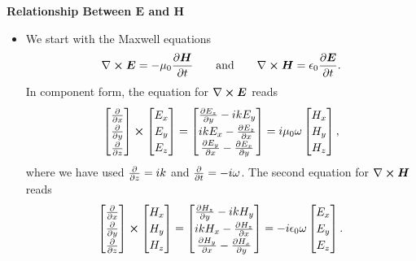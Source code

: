 \documentclass[11pt, a4paper]{article}
\newcommand{\eqtext}[1]{\qquad \text{#1} \qquad}
\renewcommand{\vec}[1]{\bm{#1}} %
\newcommand{\E}{\vec{E}}  %
\renewcommand{\H}{\vec{H}}  %
\newcommand{\ee}{\epsilon_{0}}  %
\newcommand{\mm}{\mu_{0}}  %
\newcommand{\m}{\vec{m}}  %
\renewcommand{\curl}{\nabla \cross}
\begin{document}
\textbf{Relationship Between $ \E $ and $ \H $}
\begin{itemize}
	\item We start with the Maxwell equations
	\begin{equation*}
		\curl \E = - \mm \pdv{\H}{t} \eqtext{and} \curl \H = \ee \pdv{\E}{t}.
	\end{equation*}
	In component form, the equation for $ \curl \E $ reads
	\begin{equation*}
		\renewcommand*{\arraystretch}{1.2}
		\begin{bmatrix}
		\pdv{x}\\
		\pdv{y}\\
		\pdv{z}
		\end{bmatrix}
		\cross
		\begin{bmatrix}
		E_{x}\\
		E_{y}\\
		E_{z}
		\end{bmatrix}
		= 
		\begin{bmatrix} 
		\pdv{E_{z}}{y} - ik E_{y}\\
		ik E_{x} - \pdv{E_{z}}{x}\\
		\pdv{E_{y}}{x} - \pdv{E_{x}}{y}
		\end{bmatrix} 
		= i \mm \omega
		\begin{bmatrix}
		H_{x}\\
		H_{y}\\
		H_{z}
		\end{bmatrix},
	\end{equation*}
	where we have used $ \pdv{z} = ik $ and $ \pdv{t} = -i\omega $. The second equation for $ \curl \H $ reads
	\begin{equation*}\renewcommand*{\arraystretch}{1.2}
		\begin{bmatrix}
		\pdv{x}\\
		\pdv{y}\\
		\pdv{z}
		\end{bmatrix}
		\cross
		\begin{bmatrix}
		H_{x}\\
		H_{y}\\
		H_{z}
		\end{bmatrix}
		= 
		\begin{bmatrix}
		\pdv{H_{z}}{y} - ik H_{y}\\
		ik H_{x} - \pdv{H_{z}}{x}\\
		\pdv{H_{y}}{x} - \pdv{H_{x}}{y}
		\end{bmatrix} 
		= -i \ee \omega
		\begin{bmatrix}
		E_{x}\\
		E_{y}\\
		E_{z}
		\end{bmatrix}.
	\end{equation*}
	

\end{itemize}
\end{document}
